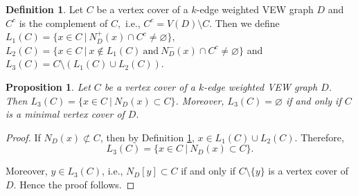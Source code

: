 \documentclass[11pt,reqno]{amsart}
\let\emptyset\varnothing
\newtheorem{proposition}[theorem]{Proposition}
\theoremstyle{definition}
\newtheorem{definition}[theorem]{Definition}
\begin{document}
\begin{definition}\label{L1L2L3}
	Let $ C $ be a vertex cover of a $k$-edge weighted VEW graph $ D $ and  $ C^c $ is the complement of $  C ,$ i.e., $ C^c = V(D) \setminus C. $ Then    	we define \vspace*{0cm}\\
	\hspace*{3cm}$ L_1(C) = \{x \in C ~|~ N_D^+ (x) \cap C^c \neq        \emptyset \}, $ \vspace*{0.2cm}\\
	\hspace*{2.85cm} $L_2(C) = \{x \in C ~|~x\notin L_1(C) ~\mbox{and}~  N_D^- (x) \cap C^c \neq   \emptyset \}$ and  \vspace*{0.2cm}\\ 
	\hspace*{2.8cm}  $ L_3(C) = C \setminus (L_1(C) \cup L_2(C))$.
\end{definition}

 \begin{proposition}\label{L3}  
	Let $ C $ be a vertex cover of a $k$-edge weighted VEW graph $ D  $.  Then $ L_3(C) =\{x\in  C~|~N_D(x) \subset C\}$. Moreover, $ L_3(C) =\emptyset $ if  and  only  if $ C $ is  a minimal vertex cover of $ D.$
\end{proposition}

\begin{proof}
 If $ N_D(x) \nsubset C   $, then by Definition \ref{L1L2L3}, $x \in  L_1(C) \cup L_2(C) $.  Therefore, $$ L_3(C) =\{x\in  C~|~N_D(x) \subset C\}.$$ 
 \par Moreover, $y \in L_3(C)$, i.e., $N_D[y] \subset C$ if and only if $C\setminus \{y\}$ is a vertex cover of $D$. Hence the proof follows.
\end{proof}

	



	
\end{document}
